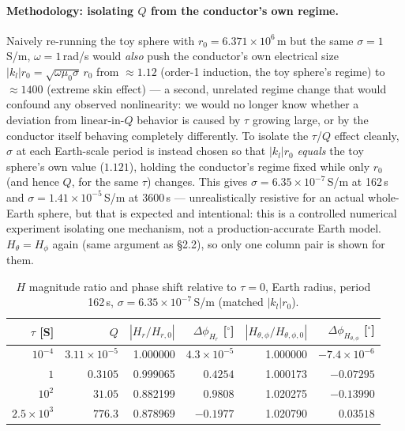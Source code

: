 \documentclass[11pt]{article}
\begin{document}
\paragraph{Methodology: isolating $Q$ from the conductor's own regime.} Naively re-running the toy
sphere with $r_0=6.371\times10^6$\,m but the same $\sigma=1$\,S/m, $\omega=1$\,rad/s would \emph{also}
push the conductor's own electrical size $|k_l|r_0=\sqrt{\omega\mu_0\sigma}\,r_0$ from $\approx1.12$
(order-1 induction, the toy sphere's regime) to $\approx1400$ (extreme skin effect) --- a second,
unrelated regime change that would confound any observed nonlinearity: we would no longer know
whether a deviation from linear-in-$Q$ behavior is caused by $\tau$ growing large, or by the
conductor itself behaving completely differently. To isolate the $\tau$/$Q$ effect cleanly, $\sigma$
at each Earth-scale period is instead chosen so that $|k_l|r_0$ \emph{equals} the toy sphere's own
value ($1.121$), holding the conductor's regime fixed while only $r_0$ (and hence $Q$, for the same
$\tau$) changes. This gives $\sigma=6.35\times10^{-7}$\,S/m at 162\,s and $\sigma=1.41\times10^{-5}$\,S/m
at 3600\,s --- unrealistically resistive for an actual whole-Earth sphere, but that is expected and
intentional: this is a controlled numerical experiment isolating one mechanism, not a production-accurate
Earth model. $H_\theta=H_\phi$ again (same argument as \S2.2), so only one column pair is shown for them.

\begin{table}[h]
\centering
\begin{tabular}{rr rr rr}
\toprule
$\tau$ [S] & $Q$ & $|H_r/H_{r,0}|$ & $\Delta\phi_{H_r}$ [$^\circ$]
           & $|H_{\theta,\phi}/H_{\theta,\phi,0}|$ & $\Delta\phi_{H_{\theta,\phi}}$ [$^\circ$] \\
\midrule
$10^{-4}$         & $3.11\times10^{-5}$ & 1.000000 & $4.3\times10^{-5}$  & 1.000000 & $-7.4\times10^{-6}$ \\
$1$               & $0.3105$            & 0.999065 & $0.4254$            & 1.000173 & $-0.07295$ \\
$10^{2}$          & $31.05$             & 0.882199 & $0.9808$            & 1.020275 & $-0.13990$ \\
$2.5\times10^{3}$ & $776.3$             & 0.878969 & $-0.1977$           & 1.020790 & $0.03518$ \\
\bottomrule
\end{tabular}
\caption{$H$ magnitude ratio and phase shift relative to $\tau=0$, Earth radius, period 162\,s,
$\sigma=6.35\times10^{-7}$\,S/m (matched $|k_l|r_0$).}
\label{tab:earth162}
\end{table}
\end{document}
